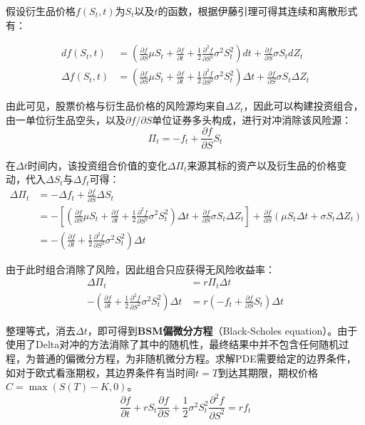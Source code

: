 \documentclass[11pt]{article}
\begin{document}
假设衍生品价格$f(S_t, t)$为$S_t$以及$t$的函数，根据伊藤引理可得其连续和离散形式有：

\begin{align*}
    df(S_t,t) & = \left(\frac{\partial f}{\partial S} \mu S_t  + \frac{\partial f}{\partial t} + \frac{1}{2}\frac{\partial^2 f}{\partial S^2} \sigma^2 S_t^2 \right)dt + \frac{\partial f}{\partial S} \sigma S_t dZ_t \\
    \Delta f(S_t,t) & = \left(\frac{\partial f}{\partial S} \mu S_t  + \frac{\partial f}{\partial t} + \frac{1}{2}\frac{\partial^2 f}{\partial S^2} \sigma^2 S_t^2 \right) \Delta t + \frac{\partial f}{\partial S} \sigma S_t \Delta Z_t
\end{align*}

由此可见，股票价格与衍生品价格的风险源均来自$\Delta Z_t$，因此可以构建投资组合，由一单位衍生品空头，以及$\partial f/\partial S$单位证券多头构成，进行对冲消除该风险源：
\begin{equation*}
    \Pi_t = -f_t + \frac{\partial f}{\partial S} S_t
\end{equation*}

在$\Delta t$时间内，该投资组合价值的变化$\Delta \Pi_t$来源其标的资产以及衍生品的价格变动，代入$\Delta S_t$与$\Delta f_t$可得：
\begin{align*}
    \Delta \Pi_t & = -\Delta f_t + \frac{\partial f}{\partial S} \Delta S_t \\
    & = -\left[ \left(\frac{\partial f}{\partial S} \mu S_t  + \frac{\partial f}{\partial t} + \frac{1}{2}\frac{\partial^2 f}{\partial S^2} \sigma^2 S_t^2 \right) \Delta t + \frac{\partial f}{\partial S} \sigma S_t \Delta Z_t \right] + \frac{\partial f}{\partial S} \left( \mu S_t \Delta t + \sigma S_t \Delta Z_t \right) \\
    & = -\left( \frac{\partial f}{\partial t} + \frac{1}{2}\frac{\partial^2 f}{\partial S^2} \sigma^2 S_t^2 \right) \Delta t
\end{align*}

由于此时组合消除了风险，因此组合只应获得无风险收益率：
\begin{align*}
    \Delta \Pi_t & = r \Pi_t \Delta t \\
    -\left( \frac{\partial f}{\partial t} + \frac{1}{2}\frac{\partial^2 f}{\partial S^2} \sigma^2 S_t^2 \right) \Delta t & =  r \left( -f_t + \frac{\partial f}{\partial S} S_t \right) \Delta t
\end{align*}

整理等式，消去$\Delta t$，即可得到\textbf{BSM偏微分方程}（Black-Scholes equation）。由于使用了Delta对冲的方法消除了其中的随机性，最终结果中并不包含任何随机过程，为普通的偏微分方程，为非随机微分方程。求解PDE需要给定的边界条件，如对于欧式看涨期权，其边界条件有当时间$t=T$到达其期限，期权价格$C=\max(S(T)-K,0)$。
\begin{equation*}
    \frac{\partial f}{\partial t} + r S_t \frac{\partial f}{\partial S} + \frac{1}{2} \sigma^2 S_t^2 \frac{\partial^2 f}{\partial S^2} = r f_t
\end{equation*}
\end{document}
